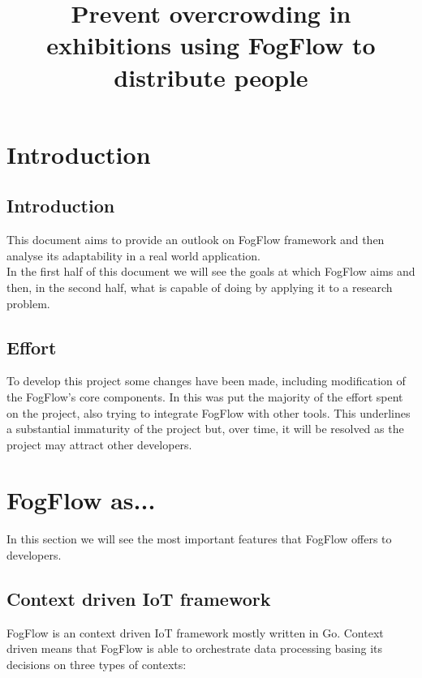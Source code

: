 \documentclass[a4paper]{article}
\title{Prevent overcrowding in exhibitions using FogFlow to distribute people}
\author{}
\date{}
\begin{document}
\maketitle
\newpage
\tableofcontents
\newpage

\section{Introduction}
\subsection{Introduction}
This document aims to provide an outlook on FogFlow framework and then analyse its adaptability in a real world application.\\
In the first half of this document we will see the goals at which FogFlow aims and then, in the second half, what is capable of doing by applying it to a research problem.

\subsection{Effort}
To develop this project some changes have been made, including modification of the FogFlow's core components. In this was put the majority of the effort spent on the project, also trying to integrate FogFlow with other tools. This underlines a substantial immaturity of the project but, over time, it will be resolved as the project may attract other developers.

\newpage
\section{FogFlow as...}
In this section we will see the most important features that FogFlow offers to developers.

\subsection{Context driven IoT framework}
FogFlow is an context driven IoT framework mostly written in Go. Context driven means that FogFlow is able to orchestrate data processing basing its decisions on three types of contexts:
\end{document}
